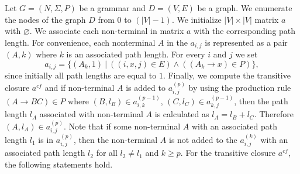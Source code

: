 \documentclass[runningheads,a4paper]{llncs}
\begin{document}
Let $G = (N,\Sigma,P)$ be a grammar and $D = (V, E)$ be a graph. We enumerate the nodes of the graph $D$ from 0 to $(|V| - 1)$. We initialize $|V| \times |V|$ matrix $a$ with $\varnothing$. We associate each non-terminal in matrix $a$ with the corresponding path length. For convenience, each nonterminal $A$ in the $a_{i,j}$ is represented as a pair $(A,k)$ where $k$ is an associated path length. For every $i$ and $j$ we set $$a_{i,j} = \{(A_k,1)~|~((i,x,j) \in E) \wedge ((A_k \rightarrow x) \in P)\},$$ since initially all path lengths are equal to $1$. Finally, we compute the transitive closure $a^{cf}$ and if non-terminal $A$ is added to $a^{(p)}_{i,j}$ by using the production rule $(A \rightarrow B C) \in P$ where $(B,l_B) \in a^{(p-1)}_{i,k}$, $(C,l_C) \in a^{(p-1)}_{k,j}$, then the path length $l_A$ associated with non-terminal $A$ is calculated as $l_A = l_B + l_C$. Therefore $(A, l_A) \in a^{(p)}_{i,j}$. Note that if some non-terminal $A$ with an associated path length $l_1$ is in $a^{(p)}_{i,j}$, then the non-terminal $A$ is not added to the $a^{(k)}_{i,j}$ with an associated path length $l_2$ for all $l_2 \neq l_1$ and $k \geq p$. For the transitive closure $a^{cf}$, the following statements hold.
\end{document}
